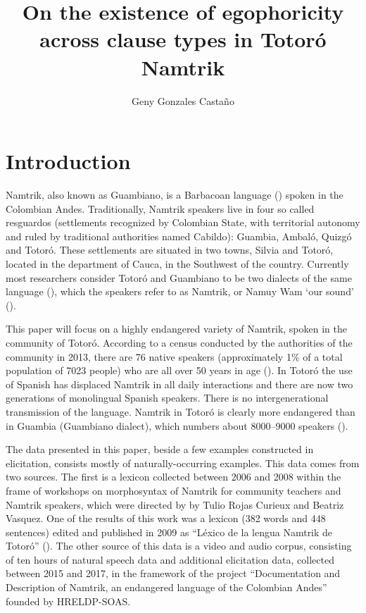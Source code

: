 \documentclass[output=paper]{langsci/langscibook}
\title{On the existence of egophoricity across clause types in Totoró Namtrik}
\author{Geny Gonzales Castaño \affiliation{Laboratoire Dynamique du Langage, Université Lumière Lyona}}
\begin{document}
\maketitle

\section{Introduction} 

Namtrik, also known as Guambiano, is a Barbacoan language (\citealt{CurnowLiddicoat1998}) spoken in the Colombian Andes. Traditionally, Namtrik speakers live in four so called resguardos (settlements recognized by Colombian State, with territorial autonomy and ruled by traditional authorities named Cabildo): Guambia, Ambaló, Quizgó and Totoró. These settlements are situated in two towns, Silvia and Totoró, located in the department of Cauca, in the Southwest of the country. Currently most researchers consider Totoró and Guambiano to be two dialects of the same language (\citealt{CurnowLiddicoat1998}), which the speakers refer to as Namtrik, or Namuy Wam ‘our sound’ (\citealt{GonzalesCastano2013}).


This paper will focus on a highly endangered variety of Namtrik, spoken in the community of Totoró. According to a census conducted by the authorities of the community in 2013, there are 76 native speakers (approximately 1\% of a total population of 7023 people) who are all over 50 years in age (\citealt[11]{GonzalesCastano2013}). In Totoró the use of Spanish has displaced Namtrik in all daily interactions and there are now two generations of monolingual Spanish speakers. There is no intergenerational transmission of the language. Namtrik in Totoró is clearly more endangered than in Guambia (Guambiano dialect), which numbers about 8000–9000 speakers (\citealt[66]{Adelaar1991}). 

The data presented in this paper, beside a few examples constructed in elicitation, consists mostly of naturally-occurring examples. This data comes from two sources. The first is a lexicon collected between 2006 and 2008 within the frame of workshops on morphosyntax of Namtrik for community teachers and Namtrik speakers, which were directed by by Tulio Rojas Curieux and Beatriz Vasquez. One of the results of this work was a lexicon (382 words and 448 sentences) edited and published in 2009 as “Léxico de la lengua Namtrik de Totoró” (\citealt{RojasCurieuxetal2009}). The other source of this data is a video and audio corpus, consisting of ten hours of natural speech data and additional elicitation data, collected between 2015 and 2017, in the framework of the project “Documentation and Description of Namtrik, an endangered language of the Colombian Andes” founded by HRELDP-SOAS. 
\end{document}
